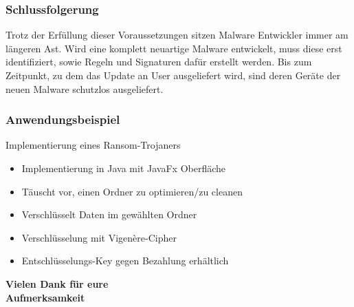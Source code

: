 \documentclass{beamer}
\begin{document}
\begin{frame}
	\frametitle{Schlussfolgerung}
	\begin{block}{}
		Trotz der Erfüllung dieser Voraussetzungen sitzen Malware Entwickler immer am längeren Ast. Wird eine komplett neuartige Malware entwickelt, muss diese erst identifiziert, sowie Regeln und Signaturen dafür erstellt werden. Bis zum Zeitpunkt, zu dem das Update an User ausgeliefert wird, sind deren Geräte der neuen Malware schutzlos ausgeliefert.
	\end{block}
\end{frame}

\begin{frame}
	\frametitle{Anwendungsbeispiel}
	Implementierung eines Ransom-Trojaners
	\begin{itemize}
		\item Implementierung in Java mit JavaFx Oberfläche
		\item Täuscht vor, einen Ordner zu optimieren/zu cleanen
		\item Verschlüsselt Daten im gewählten Ordner
		\item Verschlüsselung mit Vigenère-Cipher
		\item Entschlüsselungs-Key gegen Bezahlung erhältlich
	\end{itemize}
	
\end{frame}

\begin{frame}
	\begin{center}
	\LARGE{\textbf{ Vielen Dank für eure \\Aufmerksamkeit}}
	\end{center}
\end{frame}
\end{document}
